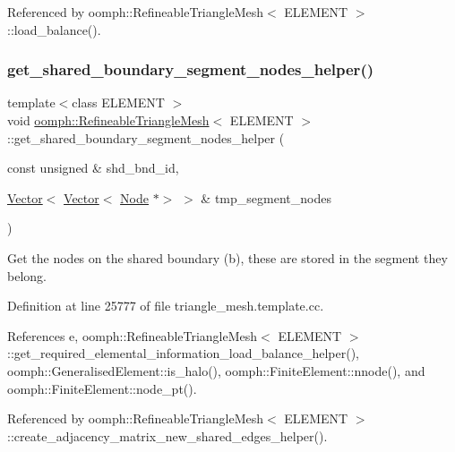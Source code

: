 Referenced by oomph\+::\+Refineable\+Triangle\+Mesh$<$ E\+L\+E\+M\+E\+N\+T $>$\+::load\+\_\+balance().

\mbox{\label{classoomph_1_1RefineableTriangleMesh_ab0a063a42df73f4c5bac4c120aa400d4}} 
\subsubsection{\texorpdfstring{get\+\_\+shared\+\_\+boundary\+\_\+segment\+\_\+nodes\+\_\+helper()}{get\_shared\_boundary\_segment\_nodes\_helper()}}
{\footnotesize\ttfamily template$<$class E\+L\+E\+M\+E\+NT $>$ \\
void \hyperlink{classoomph_1_1RefineableTriangleMesh}{oomph\+::\+Refineable\+Triangle\+Mesh}$<$ E\+L\+E\+M\+E\+NT $>$\+::get\+\_\+shared\+\_\+boundary\+\_\+segment\+\_\+nodes\+\_\+helper (\begin{DoxyParamCaption}\item[{const unsigned \&}]{shd\+\_\+bnd\+\_\+id,  }\item[{\hyperlink{classoomph_1_1Vector}{Vector}$<$ \hyperlink{classoomph_1_1Vector}{Vector}$<$ \hyperlink{classoomph_1_1Node}{Node} $\ast$$>$ $>$ \&}]{tmp\+\_\+segment\+\_\+nodes }\end{DoxyParamCaption})}



Get the nodes on the shared boundary (b), these are stored in the segment they belong. 



Definition at line 25777 of file triangle\+\_\+mesh.\+template.\+cc.



References e, oomph\+::\+Refineable\+Triangle\+Mesh$<$ E\+L\+E\+M\+E\+N\+T $>$\+::get\+\_\+required\+\_\+elemental\+\_\+information\+\_\+load\+\_\+balance\+\_\+helper(), oomph\+::\+Generalised\+Element\+::is\+\_\+halo(), oomph\+::\+Finite\+Element\+::nnode(), and oomph\+::\+Finite\+Element\+::node\+\_\+pt().



Referenced by oomph\+::\+Refineable\+Triangle\+Mesh$<$ E\+L\+E\+M\+E\+N\+T $>$\+::create\+\_\+adjacency\+\_\+matrix\+\_\+new\+\_\+shared\+\_\+edges\+\_\+helper().

